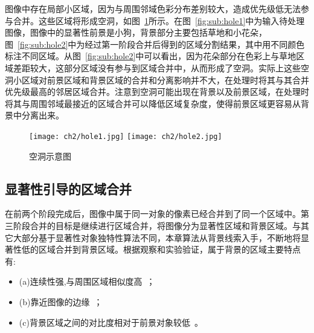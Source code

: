 图像中存在局部小区域，因为与周围邻域色彩分布差别较大，造成优先级低无法参与合并。这些区域将形成空洞，如图~\ref{fig:hole}所示。在图~\ref{fig:sub:hole1}中为输入待处理图像，图像中的显著性前景是小狗，背景部分主要包括草地和小花朵，图~\ref{fig:sub:hole2}中为经过第一阶段合并后得到的区域分割结果，其中用不同颜色标注不同区域。从图~\ref{fig:sub:hole2}中可以看出，因为花朵部分在色彩上与草地区域差距较大，这部分区域没有参与到区域合并中，从而形成了空洞。实际上这些空洞小区域对前景区域和背景区域的合并和分离影响并不大，在处理时将其与其合并优先级最高的邻居区域合并。注意到空洞可能出现在背景以及前景区域，在处理时将其与周围邻域最接近的区域合并可以降低区域复杂度，使得前景区域更容易从背景中分离出来。
\begin{figure}[htb]
  \centering%
    {\texttt{[image: ch2/hole1.jpg]}}%
 \hspace{1em}%
      {\texttt{[image: ch2/hole2.jpg]}}

  \caption{空洞示意图}
  \label{fig:hole}
\end{figure}

\subsection{显著性引导的区域合并}
\label{subsec:mergeP3}

在前两个阶段完成后，图像中属于同一对象的像素已经合并到了同一个区域中。第三阶段合并的目标是继续进行区域合并，将图像分为显著性区域和背景区域。与其它大部分基于显著性对象独特性算法不同，本章算法从背景线索入手，不断地将显著性低的区域合并到背景区域。根据观察和实验验证，属于背景的区域主要特点有:
\begin{itemize}
\item (a)连续性强,与周围区域相似度高~\cite{geodesicDistance}；
\item (b)靠近图像的边缘~\cite{backgroundPrior}；
\item (c)背景区域之间的对比度相对于前景对象较低~\cite{geodesicDistance}。
\end{itemize}

